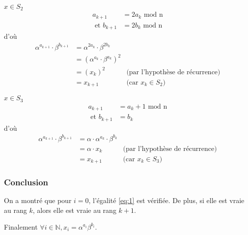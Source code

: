         \underline{$x \in S_2$}
        \begin{align*}
          a_{k+1} &= 2a_k \text{ mod n}\\
          \text{ et } b_{k+1} &= 2b_k \text{ mod n}
        \end{align*}
        d'où
        \begin{align*}
          \alpha^{a_{k+1}} \cdot \beta^{b_{k+1}} &= \alpha^{2a_k} \cdot \beta^{2b_k} \\
                                                 &= (\alpha^{a_k} \cdot \beta^{a_k})^2 \\
                                                 &= (x_k)^2 & \text{(par l'hypothèse de récurrence)} \\
                                                 &= x_{k+1} & \text{(car $x_k \in S_2$)}
        \end{align*}

        \underline{$x \in S_3$}
        \begin{align*}
          a_{k+1} &= a_k + 1 \text{ mod n} \\
          \text{ et } b_{k+1} &= b_k
        \end{align*}
        d'où
        \begin{align*}
          \alpha^{a_{k+1}} \cdot \beta^{b_{k+1}} &= \alpha \cdot \alpha^{a_k} \cdot \beta^{b_k} \\
                                                 &= \alpha \cdot x_k & \text{(par l'hypothèse de récurrence)} \\
                                                 &= x_{k+1} & \text{(car $x_k \in S_3$)}
        \end{align*}


        \subsubsection{Conclusion}
        On a montré que pour $i = 0$, l'égalité \ref{eq:1} est vérifiée.
        De plus, si elle est vraie au rang $k$, alors elle est vraie au rang $k+1$.

        Finalement $\forall i \in \mathbb{N}, x_i = \alpha^{a_i} \beta^{b_i}$.
